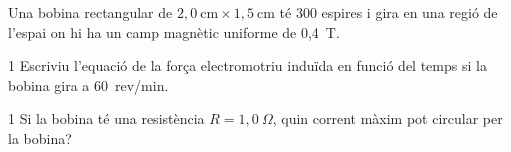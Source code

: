 Una bobina rectangular de $2,0\ \mathrm{cm}\times 1,5\ \mathrm{cm}$ té 300 espires i gira en una regió de l'espai on hi ha un camp magnètic uniforme de 0,4~T.

\begin{apartat}{1}
Escriviu l'equació de la força electromotriu induïda en funció del temps si la bobina gira a 60~rev/min.
\end{apartat}

\begin{apartat}{1}
Si la bobina té una resistència $R = 1,0\ \Omega$, quin corrent màxim pot circular per la bobina?
\end{apartat}
